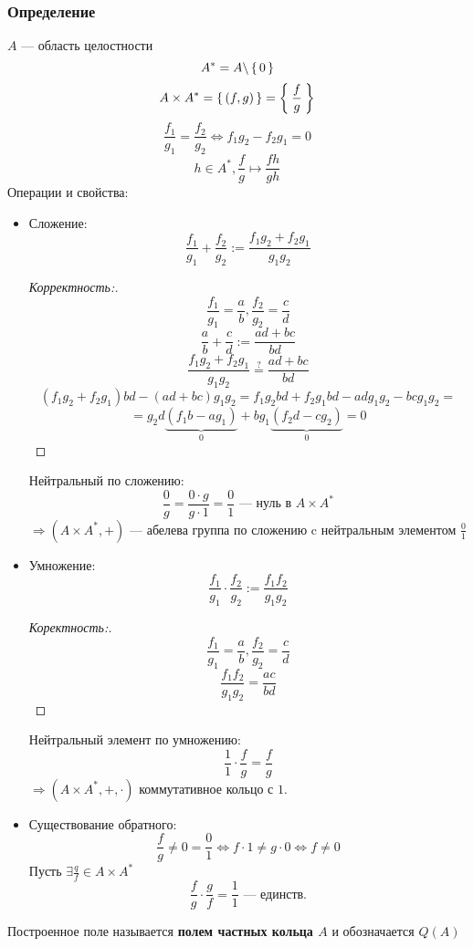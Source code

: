 \subsubsection{Определение}
$A$ --- область целостности
\[
A^{*} = A \backslash \set{0}
\]
\[
A \times A^{*} = \set{(f, g)} = \Set{\frac{f}{g}}
\]
\[
\frac{f_1}{g_1} = \frac{f_2}{g_2} \iff f_1g_2 - f_2g_1 = 0
\]
\[
h \in A^{*}, \frac{f}{g} \mapsto \frac{fh}{gh}
\]
Операции и свойства:
\begin{itemize}
  \item Сложение:
    \[
    \frac{f_1}{g_1} + \frac{f_2}{g_2} := \frac{f_1 g_2 + f_2 g_1}{g_1 g_2}
    \]
    \begin{proof}[Корректность:]
      \[
      \frac{f_1}{g_1} = \frac{a}{b}, \frac{f_2}{g_2} = \frac{c}{d}
      \]  
      \[
      \frac{a}{b} + \frac{c}{d} := \frac{ad + bc}{bd}
      \]
    \[
      \frac{f_1 g_2 + f_2g_1}{g_1g_2} \overset{?}{=} \frac{ad + bc}{bd}
    \]
    \[
      (f_1g_2 + f_2g_1)bd - (ad + bc)g_1 g_2 = f_1g_2bd + f_2g_1bd - adg_1g_2 - bcg_1g_2 = 
    \]
    \[
    = g_2d\underbrace{(f_1b - ag_1)}_{0}  + bg_1\underbrace{(f_2d - cg_2)}_{0} = 0
    \]

    \end{proof}

    Нейтральный по сложению:
    \[
      \frac{0}{g} = \frac{0 \cdot g}{g \cdot 1} = \frac{0}{1} \text{ --- нуль в $A \times A^{*}$}
    \] 
    $\Rightarrow (A \times A^{*}, +)$  --- абелева группа по сложению c нейтральным элементом $\frac{0}{1}$
  \item Умножение:
    \[
      \frac{f_1}{g_1} \cdot \frac{f_2}{g_2} := \frac{f_1 f_2}{g_1 g_2}
    \]
    \begin{proof}[Коректность:]
    \[
    \frac{f_1}{g_1} = \frac{a}{b}, \frac{f_2}{g_2} = \frac{c}{d}
    \] 
    \[
      \frac{f_1 f_2}{g_1 g_2} = \frac{ac}{bd}
    \]
    \end{proof}
     Нейтральный элемент по умножению:
     \[
      \frac{1}{1} \cdot \frac{f}{g} = \frac{f}{g}
     \]
     $\Rightarrow (A \times A^{*}, +, \cdot)$ коммутативное кольцо с $1$.
   \item Существование обратного:
     \[
     \frac{f}{g} \neq 0 = \frac{0}{1} \iff f \cdot 1 \neq g \cdot 0 \iff f \neq 0
     \]
     Пусть $\exists \frac{q}{f} \in A \times A^{*}$
     \[
     \frac{f}{g} \cdot \frac{g}{f} = \frac{1}{1} \text{ --- единств.}
     \]
\end{itemize}
\begin{definition}
  Построенное поле называется \textbf{полем частных кольца $A$} и обозначается $Q(A)$
\end{definition}

